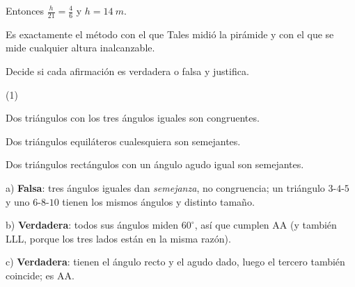 \documentclass[11pt]{article}
\begin{document}
\begin{preguntas}
\begin{solucion}[4cm]
Entonces $\frac{h}{21} = \frac{4}{6}$ y $h = \qty{14}{m}$.

Es exactamente el método con el que Tales midió la pirámide y con el que se mide cualquier
altura inalcanzable.
\end{solucion}

\pregunta[1.5] Decide si cada afirmación es verdadera o falsa y justifica.
\begin{opciones*}(1)
  \item Dos triángulos con los tres ángulos iguales son congruentes.
  \item Dos triángulos equiláteros cualesquiera son semejantes.
  \item Dos triángulos rectángulos con un ángulo agudo igual son semejantes.
\end{opciones*}
\begin{solucion}[5.5cm]
a) \textbf{Falsa}: tres ángulos iguales dan \emph{semejanza}, no congruencia; un triángulo
$3$-$4$-$5$ y uno $6$-$8$-$10$ tienen los mismos ángulos y distinto tamaño.

b) \textbf{Verdadera}: todos sus ángulos miden $60^\circ$, así que cumplen AA (y también LLL,
porque los tres lados están en la misma razón).

c) \textbf{Verdadera}: tienen el ángulo recto y el agudo dado, luego el tercero también
coincide; es AA.
\end{solucion}

\end{preguntas}
\end{document}
